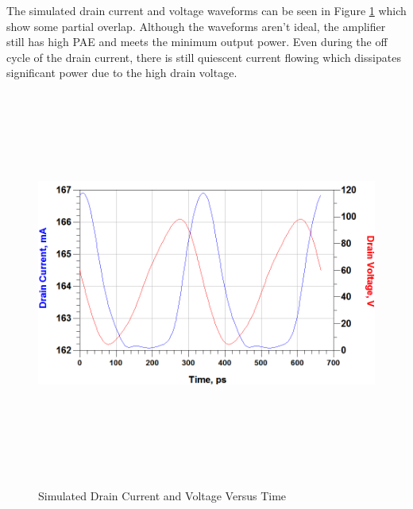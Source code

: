 The simulated drain current and voltage waveforms can be seen in Figure \ref{fig:ids_vds_wave} which show some partial overlap. Although the waveforms aren't ideal, the amplifier still has high PAE and meets the minimum output power. Even during the off cycle of the drain current, there is still quiescent current flowing which dissipates significant power due to the high drain voltage.

\begin{figure}
  \centering
  \includegraphics[width=5in,height=5in,keepaspectratio]{figures/simulation/ids_vds_wave}\\
  \caption{Simulated Drain Current and Voltage Versus Time}
  \label{fig:ids_vds_wave}
\end{figure}


